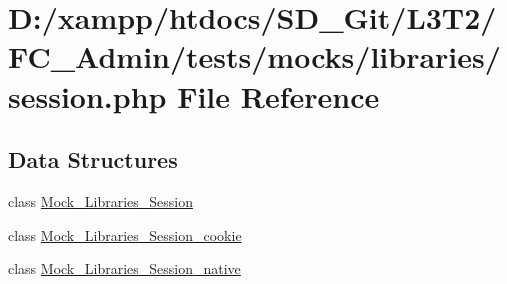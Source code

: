 \hypertarget{_admin_2tests_2mocks_2libraries_2_session_8php}{}\section{D\+:/xampp/htdocs/\+S\+D\+\_\+\+Git/\+L3\+T2/\+F\+C\+\_\+\+Admin/tests/mocks/libraries/session.php File Reference}
\label{_admin_2tests_2mocks_2libraries_2_session_8php}
\subsection*{Data Structures}
\begin{DoxyCompactItemize}
\item 
class \hyperlink{class_mock___libraries___session}{Mock\+\_\+\+Libraries\+\_\+\+Session}
\item 
class \hyperlink{class_mock___libraries___session__cookie}{Mock\+\_\+\+Libraries\+\_\+\+Session\+\_\+cookie}
\item 
class \hyperlink{class_mock___libraries___session__native}{Mock\+\_\+\+Libraries\+\_\+\+Session\+\_\+native}
\end{DoxyCompactItemize}
